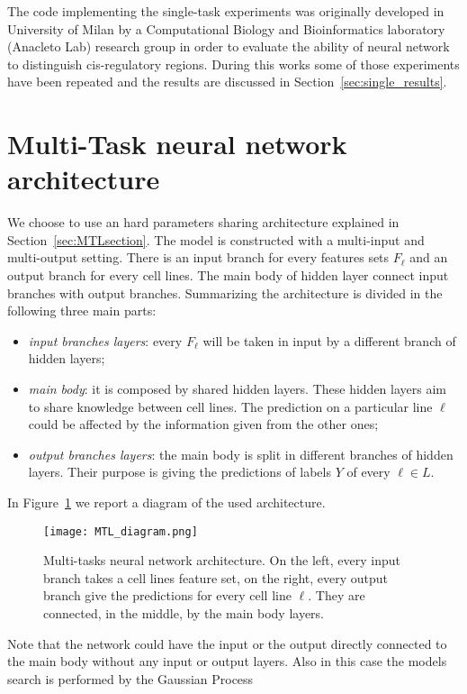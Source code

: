 The code implementing the single-task experiments was originally developed in University of Milan by a Computational Biology and Bioinformatics laboratory (Anacleto Lab) research group in order to evaluate the ability of neural network to distinguish cis-regulatory regions. During this works some of those experiments have been repeated and the results are discussed in Section~\ref{sec:single_results}. 

\section{Multi-Task neural network architecture} \label{sec:exp_setup_multitask}
We choose to use an hard parameters sharing architecture explained in Section~\ref{sec:MTLsection}. The model is constructed with a multi-input and multi-output setting. There is an input branch for every features sets $F_\ell$ and an output branch for every cell lines. The main body of hidden layer connect input branches with output branches. Summarizing the architecture is divided in the following three main parts:
\begin{itemize}
    \item \textit{input branches layers}: every $F_\ell$ will be taken in input by a different branch of hidden layers;
    \item \textit{main body}: it is composed by shared hidden layers. These hidden layers aim to share knowledge between cell lines. The prediction on a particular line $\ell$ could be affected by the information given from the other ones;
    \item \textit{output branches layers}: the main body is split in different branches of hidden layers. Their purpose is giving the predictions of labels $Y$ of every $\ell \in L$.
\end{itemize}
In Figure~\ref{fig:MTL_arch_diagram} we report a diagram of the used architecture.
\begin{figure}[ht]
\centering
\texttt{[image: MTL\_diagram.png]}
\caption{Multi-tasks neural network architecture. On the left, every input branch takes a cell lines feature set, on the right, every output branch give the predictions for every cell line $\ell$. They are connected, in the middle, by the main body layers. } 
\label{fig:MTL_arch_diagram}
\end{figure}
Note that the network could have the input or the output directly connected to the main body without any input or output layers. 
Also in this case the models search is performed by the Gaussian Process
